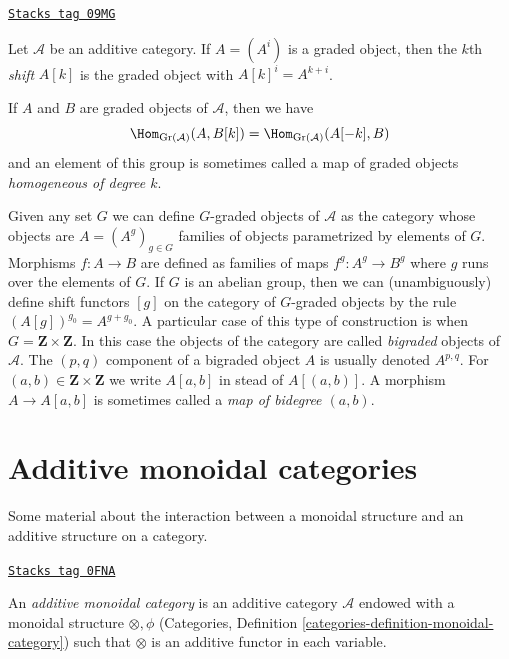 \begin{definition}
\label{homology-definition-graded-shift}
\href{https://stacks.math.columbia.edu/tag/09MG}{\texttt{Stacks tag 09MG}}

Let $\mathcal{A}$ be an additive category. If $A = (A^i)$ is a graded object,
then the $k$th {\it shift} $A[k]$ is the graded object with
$A[k]^i = A^{k + i}$.
\end{definition}

If $A$ and $B$ are graded objects of $\mathcal{A}$, then we have
\begin{equation}
\label{equation-hom-into-shift}
\Hom_{\text{Gr}(\mathcal{A})}(A, B[k]) =
\Hom_{\text{Gr}(\mathcal{A})}(A[-k], B)
\end{equation}
and an element of this group is sometimes called a map of graded
objects {\it homogeneous of degree $k$}.

\medskip\noindent
Given any set $G$ we can define $G$-graded objects of $\mathcal{A}$
as the category whose objects are $A = (A^g)_{g \in G}$
families of objects parametrized by elements of $G$. Morphisms
$f : A \to B$ are defined as families of maps $f^g : A^g \to B^g$
where $g$ runs over the elements of $G$. If $G$ is an abelian group,
then we can (unambiguously) define shift functors $[g]$ on the category
of $G$-graded objects by the rule $(A[g])^{g_0} = A^{g + g_0}$.
A particular case of this type of construction is when
$G = \mathbf{Z} \times \mathbf{Z}$. In this case the objects of
the category are called {\it bigraded} objects of $\mathcal{A}$.
The $(p, q)$ component of a bigraded object $A$ is usually denoted
$A^{p, q}$. For $(a, b) \in \mathbf{Z} \times \mathbf{Z}$ we write
$A[a, b]$ in stead of $A[(a, b)]$.
A morphism $A \to A[a, b]$ is sometimes called a
{\it map of bidegree $(a, b)$}.

\section{Additive monoidal categories}
\label{homology-section-monoidal}
Some material about the interaction between a monoidal structure
and an additive structure on a category.

\begin{definition}
\label{homology-definition-additive-monoidal}
\href{https://stacks.math.columbia.edu/tag/0FNA}{\texttt{Stacks tag 0FNA}}

An {\it additive monoidal category} is an additive category $\mathcal{A}$
endowed with a monoidal structure $\otimes, \phi$
(Categories, Definition \ref{categories-definition-monoidal-category})
such that $\otimes$ is an additive functor in each variable.
\end{definition}

